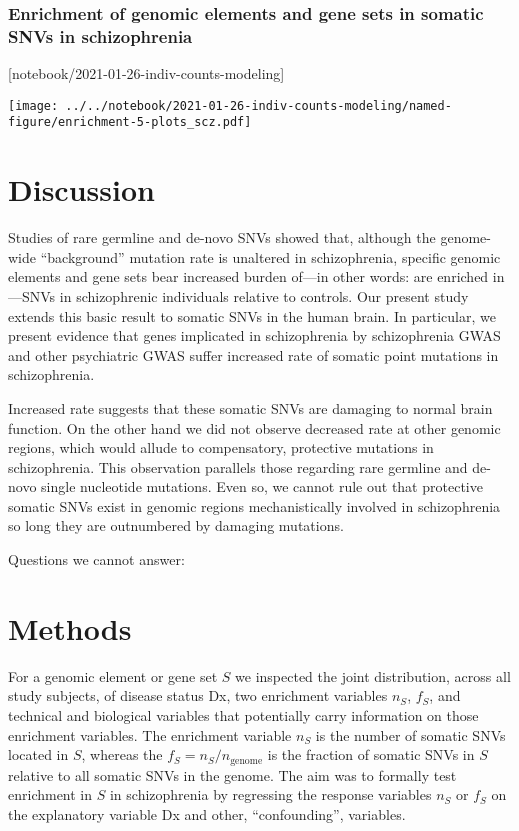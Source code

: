 \documentclass[letterpaper]{article}
\begin{document}
\subsubsection*{Enrichment of genomic elements and gene sets in somatic SNVs in schizophrenia}

[notebook/2021-01-26-indiv-counts-modeling]

\texttt{[image: ../../notebook/2021-01-26-indiv-counts-modeling/named-figure/enrichment-5-plots\_scz.pdf]}

\section*{Discussion}

Studies of rare germline and
de-novo SNVs showed that, although the genome-wide ``background'' mutation
rate is unaltered in schizophrenia, specific genomic elements and gene sets
bear increased burden of---in other words: are enriched in---SNVs in
schizophrenic individuals relative to controls.  Our present study extends
this basic result to somatic SNVs in the human brain.  In particular, we
present evidence that genes implicated in schizophrenia by schizophrenia GWAS and other psychiatric
GWAS suffer increased rate of somatic point mutations in schizophrenia.

Increased rate suggests that these somatic SNVs are damaging to normal brain
function.  On the other hand we did not observe decreased rate at other
genomic regions, which would allude to compensatory, protective mutations in
schizophrenia.  This observation parallels those regarding rare germline and
de-novo single nucleotide mutations.  Even so, we cannot rule out that
protective somatic SNVs exist in genomic regions mechanistically involved in
schizophrenia so long they are outnumbered by damaging mutations.

Questions we cannot answer:

\section*{Methods}

For a genomic element or gene set  \(S\) we inspected the joint distribution,
across all study subjects, of disease status Dx, two enrichment variables
\(n_S\), \(f_S\), and technical and biological variables that potentially
carry information on those enrichment variables.  The enrichment variable
\(n_S\) is the number of somatic SNVs located in \(S\), whereas the \(f_S =
	n_S/n_\mathrm{genome}\) is the fraction of somatic SNVs in \(S\)
relative to all somatic SNVs in the genome.  The aim was to formally test
enrichment in \(S\) in schizophrenia by regressing the response variables
\(n_S\) or \(f_S\) on the explanatory variable Dx
and other, ``confounding'', variables.
\end{document}
